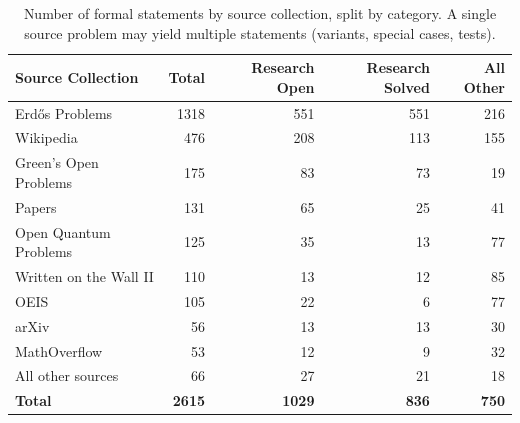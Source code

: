 \begin{table}[h]
    \caption{Number of formal statements by source collection, split by category. A single source problem may yield multiple statements (variants, special cases, tests).}
    \label{tab:problems-by-collection}
    \centering
    \begin{tabular}{lrrrr}
    \toprule
    \textbf{Source Collection} & \textbf{Total} & \textbf{Research Open} & \textbf{Research Solved} & \textbf{All Other} \\
    \midrule
    Erd\H{o}s Problems & 1318 & 551 & 551 & 216 \\
    Wikipedia & 476 & 208 & 113 & 155 \\
    Green's Open Problems & 175 & 83 & 73 & 19 \\
    Papers & 131 & 65 & 25 & 41 \\
    Open Quantum Problems & 125 & 35 & 13 & 77 \\
    Written on the Wall II & 110 & 13 & 12 & 85 \\
    OEIS & 105 & 22 & 6 & 77 \\
    arXiv & 56 & 13 & 13 & 30 \\
    MathOverflow & 53 & 12 & 9 & 32 \\
    All other sources & 66 & 27 & 21 & 18 \\
    \midrule
    \textbf{Total} & \textbf{2615} & \textbf{1029} & \textbf{836} & \textbf{750} \\
    \bottomrule
    \end{tabular}
\end{table}
